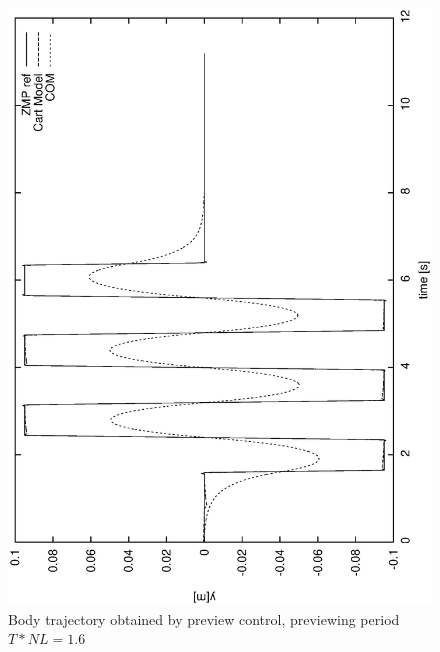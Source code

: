 \begin{figure}[htb]
\begin{center}
\includegraphics[width=\linewidth]{./figures/PatternGenerator/FigurePC1_Y}
\caption{Body trajectory obtained by preview control, previewing period $T * NL = 1.6$ }
\label{pic:BodyTrajectory}
\end{center}
\end{figure}
\clearpage
